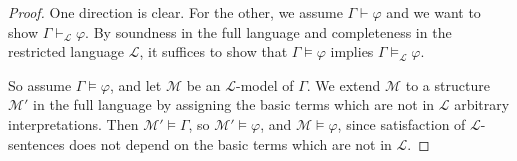 \documentclass[letterpaper]{article}
\theoremstyle{definition}
\newcommand{\Model}{\mathcal{M}}
\begin{document}
\begin{proof}
One direction is clear. For the other, we assume $\Gamma\vdash \varphi$ and we want to show $\Gamma\vdash_{\mathcal{L}}\varphi$. By soundness in the full language and completeness in the restricted language $\mathcal{L}$, it suffices to show that $\Gamma\models \varphi$ implies  $\Gamma\models_{\mathcal{L}} \varphi$.

So assume $\Gamma\models \varphi$, and let $\Model$ be an $\mathcal{L}$-model of $\Gamma$. We extend $\Model$ to a structure $\Model'$ in the full language by assigning the basic terms which are not in $\mathcal{L}$ arbitrary interpretations. Then $\Model'\models \Gamma$, so $\Model'\models \varphi$, and $\Model\models \varphi$, since satisfaction of $\mathcal{L}$-sentences does not depend on the basic terms which are not in $\mathcal{L}$.  
\end{proof}
\end{document}
